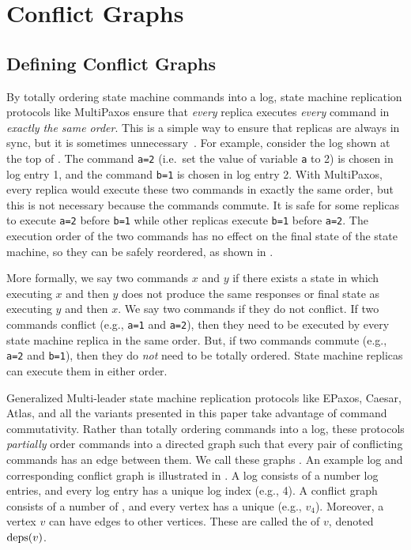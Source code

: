 \section{Conflict Graphs}
\subsection{Defining Conflict Graphs}
By totally ordering state machine commands into a log, state machine
replication protocols like MultiPaxos ensure that \emph{every} replica executes
\emph{every} command in \emph{exactly the same order}. This is a simple way to
ensure that replicas are always in sync, but it is sometimes
unnecessary~\cite{lamport2005generalized}. For example, consider the log shown
at the top of . The command \texttt{a=2} (i.e.\ set the
value of variable \texttt{a} to 2) is chosen in log entry 1, and the command
\texttt{b=1} is chosen in log entry 2. With MultiPaxos, every replica would
execute these two commands in exactly the same order, but this is not necessary
because the commands commute. It is safe for some replicas to execute
\texttt{a=2} before \texttt{b=1} while other replicas execute \texttt{b=1}
before \texttt{a=2}. The execution order of the two commands has no effect on
the final state of the state machine, so they can be safely reordered, as shown
in .

{}

More formally, we say two commands $x$ and $y$  if there
exists a state in which executing $x$ and then $y$ does not produce the same
responses or final state as executing $y$ and then $x$. We say two commands
 if they do not conflict. If two commands conflict (e.g.,
\texttt{a=1} and \texttt{a=2}), then they need to be executed by every state
machine replica in the same order. But, if two commands commute (e.g.,
\texttt{a=2} and \texttt{b=1}), then they do \emph{not} need to be totally
ordered. State machine replicas can execute them in either order.

Generalized Multi-leader state machine replication protocols like EPaxos,
Caesar, Atlas, and all the \BPaxos{} variants presented in this paper take
advantage of command commutativity. Rather than totally ordering commands into
a log, these protocols \emph{partially} order commands into a directed graph
such that every pair of conflicting commands has an edge between them. We call
these graphs . An example log and corresponding
conflict graph is illustrated in . A log consists of a
number log entries, and every log entry has a unique log index (e.g., 4). A
conflict graph consists of a number of , and every vertex has
a unique  (e.g., $v_4$). Moreover, a vertex $v$ can have
edges to other vertices. These are called the  of $v$,
denoted $\text{deps}(v)$.

